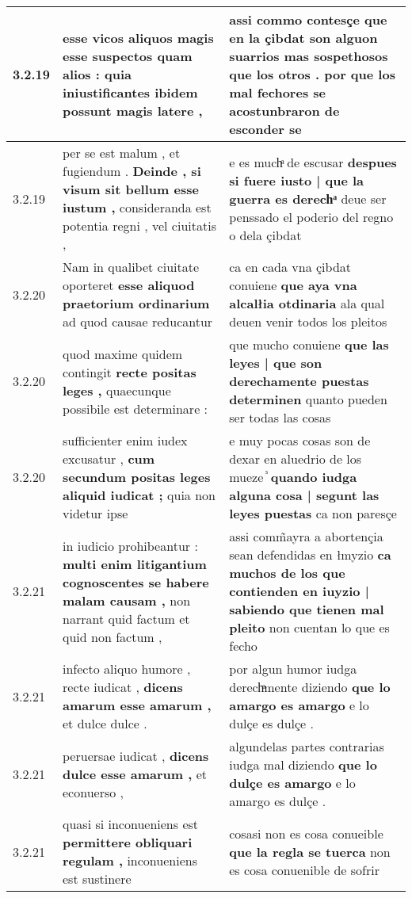\begin{tabular}{|p{1cm}|p{6.5cm}|p{6.5cm}|}
3.2.19 & esse vicos aliquos \textbf{ magis esse suspectos quam alios : } quia iniustificantes ibidem possunt magis latere , & assi commo contesçe \textbf{ que en la çibdat son alguon suarrios mas sospethosos que los otros . } por que los mal fechores se acostunbraron de esconder se \\\hline
3.2.19 & per se est malum , et fugiendum . \textbf{ Deinde , si visum sit bellum esse iustum , } consideranda est potentia regni , vel ciuitatis , & e es muchͣ de escusar \textbf{ despues si fuere iusto | que la guerra es derechͣ } deue ser penssado el poderio del regno o dela çibdat \\\hline
3.2.20 & Nam in qualibet ciuitate oporteret \textbf{ esse aliquod praetorium ordinarium } ad quod causae reducantur & ca en cada vna çibdat conuiene \textbf{ que aya vna alcalłia otdinaria } ala qual deuen venir todos los pleitos \\\hline
3.2.20 & quod maxime quidem contingit \textbf{ recte positas leges , } quaecunque possibile est determinare : & que mucho conuiene \textbf{ que las leyes | que son derechamente puestas determinen } quanto pueden ser todas las cosas \\\hline
3.2.20 & sufficienter enim iudex excusatur , \textbf{ cum secundum positas leges aliquid iudicat ; } quia non videtur ipse & e muy pocas cosas son de dexar en aluedrio de los mueze ᷤ \textbf{ quando iudga alguna cosa | segunt las leyes puestas } ca non paresçe \\\hline
3.2.21 & in iudicio prohibeantur : \textbf{ multi enim litigantium cognoscentes se habere malam causam , } non narrant quid factum et quid non factum , & assi comm̃ayra a abortençia sean defendidas en łmyzio \textbf{ ca muchos de los que contienden en iuyzio | sabiendo que tienen mal pleito } non cuentan lo que es fecho \\\hline
3.2.21 & infecto aliquo humore , recte iudicat , \textbf{ dicens amarum esse amarum , } et dulce dulce . & por algun humor iudga derechͣmente diziendo \textbf{ que lo amargo es amargo } e lo dulçe es dulçe . \\\hline
3.2.21 & peruersae iudicat , \textbf{ dicens dulce esse amarum , } et econuerso , & algundelas partes contrarias iudga mal diziendo \textbf{ que lo dulçe es amargo } e lo amargo es dulçe . \\\hline
3.2.21 & quasi si inconueniens est \textbf{ permittere obliquari regulam , } inconueniens est sustinere & cosasi non es cosa conueible \textbf{ que la regla se tuerca } non es cosa conuenible de sofrir \\\hline

\end{tabular}
